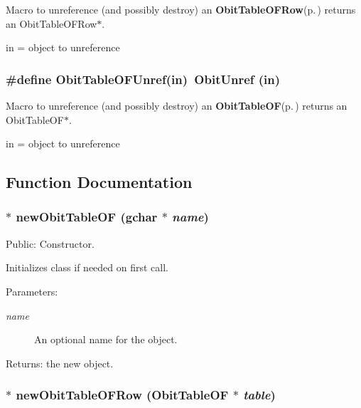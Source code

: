 Macro to unreference (and possibly destroy) an {\bf Obit\-Table\-OFRow}{\rm (p.\,\pageref{structObitTableOFRow})} returns an Obit\-Table\-OFRow$\ast$. 

in = object to unreference 
\subsubsection{\setlength{\rightskip}{0pt plus 5cm}\#define Obit\-Table\-OFUnref(in)\ Obit\-Unref (in)}\label{ObitTableOF_8h_a1}


Macro to unreference (and possibly destroy) an {\bf Obit\-Table\-OF}{\rm (p.\,\pageref{structObitTableOF})} returns an Obit\-Table\-OF$\ast$. 

in = object to unreference 

\subsection{Function Documentation}
\subsubsection{$\ast$ new\-Obit\-Table\-OF (gchar $\ast$ {\em name})}\label{ObitTableOF_8h_a11}


Public: Constructor. 

Initializes class if needed on first call. \begin{Desc}
\item[Parameters:]
\begin{description}
\item[{\em name}]An optional name for the object. \end{description}
\end{Desc}
\begin{Desc}
\item[Returns:]the new object. \end{Desc}
\subsubsection{$\ast$ new\-Obit\-Table\-OFRow ({\bf Obit\-Table\-OF} $\ast$ {\em table})}\label{ObitTableOF_8h_a8}


